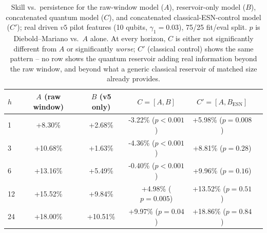 \begin{table}[t]
\centering\footnotesize
\begin{tabular}{lccccc}
\toprule
$h$ & $A$ (raw window) & $B$ (v5 only) & $C{=}[A,B]$ & $C'{=}[A,B_{\text{ESN}}]$ \\
\midrule
1 & +8.30\% & +2.68\% & -3.22\% ($p{<}0.001$) & +5.98\% ($p{=}0.008$) \\
3 & +10.68\% & +1.63\% & -4.36\% ($p{<}0.001$) & +8.81\% ($p{=}0.28$) \\
6 & +13.16\% & +5.49\% & -0.40\% ($p{<}0.001$) & +9.96\% ($p{=}0.16$) \\
12 & +15.52\% & +9.84\% & +4.98\% ($p{=}0.005$) & +13.52\% ($p{=}0.51$) \\
24 & +18.00\% & +10.51\% & +9.97\% ($p{=}0.04$) & +18.86\% ($p{=}0.84$) \\
\bottomrule
\end{tabular}
\caption{Skill vs.\ persistence for the raw-window model ($A$), reservoir-only model ($B$), concatenated quantum model ($C$), and concatenated classical-ESN-control model ($C'$); real driven $v5$ pilot features (10 qubits, $\gamma_1{=}0.03$), 75/25 fit/eval split. $p$ is Diebold--Mariano vs.\ $A$ alone. At every horizon, $C$ is either not significantly different from $A$ or significantly \emph{worse}; $C'$ (classical control) shows the same pattern -- no row shows the quantum reservoir adding real information beyond the raw window, and beyond what a generic classical reservoir of matched size already provides.}
\label{tab:concat}
\end{table}
